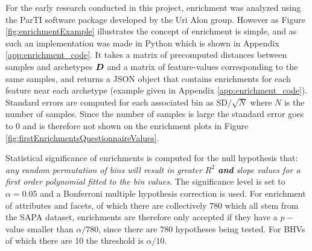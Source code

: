 For the early research conducted in this project, enrichment was analyzed using the ParTI software package developed by the Uri Alon group. However as Figure \ref{fig:enrichmentExample} illustrates the concept of enrichment is simple, and as such an implementation was made in Python which is shown in Appendix \ref{app:enrichment_code}. It takes a matrix of precomputed distances between samples and archetypes $\bm{D}$ and a matrix of feature-values corresponding to the same samples, and returns a JSON object that contains enrichments for each feature near each archetype (example given in Appendix \ref{app:enrichment_code}). Standard errors are computed for each associated bin as $\mathrm{SD}/\sqrt{N}$ where $N$ is the number of samples. Since the number of samples is large the standard error goes to 0 and is therefore not shown on the enrichment plots in Figure \ref{fig:firstEnrichmentsQuestionnaireValues}.

Statistical significance of enrichments is computed for the null hypothesis that: \textit{any random permutation of bins will result in greater $R^2$ \textbf{and} slope values for a first order polynomial fitted to the bin values}. The significance level is set to $\alpha = 0.05$ and a Bonferroni multiple hypothesis correction is used. For enrichment of attributes and facets, of which there are collectively 780 which all stem from the SAPA dataset, enrichments are therefore only accepted if they have a $p-$value smaller than $\alpha/780$, since there are 780 hypotheses being tested. For BHVs of which there are 10 the threshold is $\alpha/10$.